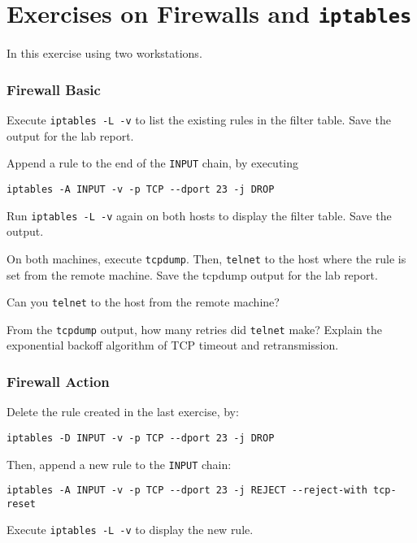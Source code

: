 \documentclass{../UTNetLab}
\begin{document}
\part{Exercises on Firewalls and \texttt{iptables}}
    In this exercise using two workstations.

\section{Firewall Basic}
    Execute \lstinline{iptables -L -v} to list the existing rules in the filter table. Save the output for the lab report.

    Append a rule to the end of the \texttt{INPUT} chain, by executing
    \begin{lstlisting}
iptables -A INPUT -v -p TCP --dport 23 -j DROP
    \end{lstlisting}
    
    Run \lstinline{iptables -L -v} again on both hosts to display the filter table. Save the output.

    On both machines, execute \lstinline{tcpdump}. Then, \lstinline{telnet} to the host where the rule is set from the remote machine. Save the tcpdump output for the lab report.

    \begin{report}
    \item Can you \lstinline{telnet} to the host from the remote machine?
    
    \item From the \lstinline{tcpdump} output, how many retries did \lstinline{telnet} make? Explain the exponential backoff algorithm of TCP timeout and retransmission.
    \end{report}
    
\section{Firewall Action}
    Delete the rule created in the last exercise, by:    
    \begin{lstlisting}
iptables -D INPUT -v -p TCP --dport 23 -j DROP
    \end{lstlisting}
    
    Then, append a new rule to the \texttt{INPUT} chain:    
    \begin{lstlisting}
iptables -A INPUT -v -p TCP --dport 23 -j REJECT --reject-with tcp-reset
    \end{lstlisting}
    
    Execute \lstinline{iptables -L -v} to display the new rule.
\end{document}
